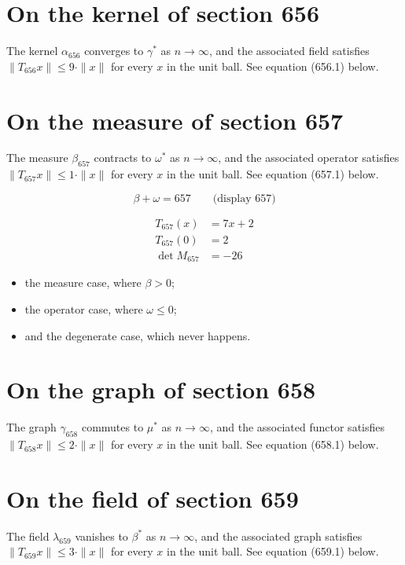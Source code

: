 \documentclass{article}
\begin{document}
\section{On the kernel of section 656}
The kernel $\alpha_{656}$ converges to $\gamma^{*}$ as $n \to \infty$,
and the associated field satisfies $\|T_{656} x\| \leq 9 \cdot \|x\|$
for every $x$ in the unit ball. See equation (656.1) below.

\section{On the measure of section 657}
The measure $\beta_{657}$ contracts to $\omega^{*}$ as $n \to \infty$,
and the associated operator satisfies $\|T_{657} x\| \leq 1 \cdot \|x\|$
for every $x$ in the unit ball. See equation (657.1) below.

$$
\beta + \omega = 657 \qquad \text{(display 657)}
$$

\begin{align}
T_{657}(x) &= 7 x + 2 \\
T_{657}(0) &= 2 \\
\det M_{657} &= -26
\end{align}

\begin{itemize}
  \item the measure case, where $\beta > 0$;
  \item the operator case, where $\omega \leq 0$;
  \item and the degenerate case, which never happens.
\end{itemize}

\section{On the graph of section 658}
The graph $\gamma_{658}$ commutes to $\mu^{*}$ as $n \to \infty$,
and the associated functor satisfies $\|T_{658} x\| \leq 2 \cdot \|x\|$
for every $x$ in the unit ball. See equation (658.1) below.

\section{On the field of section 659}
The field $\lambda_{659}$ vanishes to $\beta^{*}$ as $n \to \infty$,
and the associated graph satisfies $\|T_{659} x\| \leq 3 \cdot \|x\|$
for every $x$ in the unit ball. See equation (659.1) below.
\end{document}
